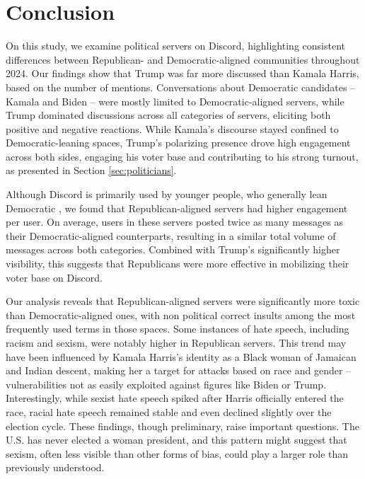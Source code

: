 \section{Conclusion}
\label{sec:concludingremarks}

On this study, we examine political servers on Discord, highlighting consistent differences between Republican- and Democratic-aligned communities throughout 2024. Our findings show that Trump was far more discussed than Kamala Harris, based on the number of mentions. Conversations about Democratic candidates -- Kamala and Biden -- were mostly limited to Democratic-aligned servers, while Trump dominated discussions across all categories of servers, eliciting both positive and negative reactions.  While Kamala’s discourse stayed confined to Democratic-leaning spaces, Trump’s polarizing presence drove high engagement across both sides, engaging  his voter base and contributing to his strong turnout, as presented in Section \ref{sec:politicians}.

Although Discord is primarily used by younger people, who generally lean Democratic \cite{IOP2024}, we found that Republican-aligned servers had higher engagement per user. On average, users in these servers posted twice as many messages as their Democratic-aligned counterparts, resulting in a similar total volume of messages across both categories. Combined with Trump’s significantly higher visibility, this suggests that Republicans were more effective in mobilizing their voter base on Discord.

Our analysis reveals that Republican-aligned servers were significantly more toxic than Democratic-aligned ones, with non political correct insults among the most frequently used terms in those spaces. Some instances of hate speech, including racism and sexism, were notably higher in Republican servers. This trend may have been influenced by Kamala Harris’s identity as a Black woman of Jamaican and Indian descent, making her a target for attacks based on race and gender -- vulnerabilities not as easily exploited against figures like Biden or Trump. Interestingly, while sexist hate speech spiked after Harris officially entered the race, racial hate speech remained stable and even declined slightly over the election cycle. These findings, though preliminary, raise important questions. The U.S. has never elected a woman president, and this pattern might suggest that sexism, often less visible than other forms of bias, could play a larger role than previously understood.

